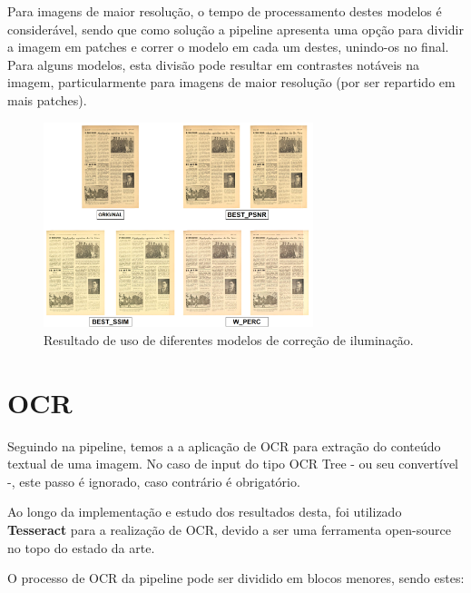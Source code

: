 Para imagens de maior resolução, o tempo de processamento destes modelos é considerável, sendo que como solução a pipeline apresenta uma opção para dividir a imagem em patches e correr o modelo em cada um destes, unindo-os no final. Para alguns modelos, esta divisão pode resultar em contrastes notáveis na imagem, particularmente para imagens de maior resolução (por ser repartido em mais patches).

\begin{figure}[H]
	\centering
	\includegraphics[width=0.7\textwidth]{images/ilustracoes/fix_illumination_example.png}
	\caption{Resultado de uso de diferentes modelos de correção de iluminação.}
	\label{fig:fix_illumination_example}
\end{figure}


\section{OCR}


Seguindo na pipeline, temos a a aplicação de OCR para extração do conteúdo textual de uma imagem. No caso de input do tipo OCR Tree - ou seu convertível -, este passo é ignorado, caso contrário é obrigatório.


Ao longo da implementação e estudo dos resultados desta, foi utilizado \textbf{Tesseract} para a realização de OCR, devido a ser uma ferramenta open-source no topo do estado da arte.

O processo de OCR da pipeline pode ser dividido em blocos menores, sendo estes:

